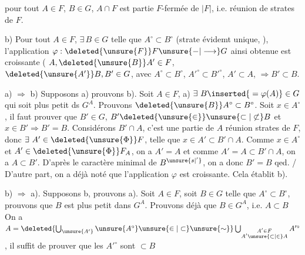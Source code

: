 pour tout $A\in F$, $B\in G$, $A\cap F$ est  partie $F$-fermée de $|F|$, i.e. réunion de strates de $F$.

b) Pour tout $A\in F$, $\exists\,B\in G$ telle que $A^\circ\subset B^\circ$ (strate évidemt unique, ), l'application $\varphi:\deleted{\unsure{F}}F\unsure{-|\longrightarrow}G$ ainsi obtenue est croissante (
   $A,\deleted{\unsure{B}}A'\in F$, $\deleted{\unsure{A'}}B,B'\in G$,  avec $A^\circ\subset B^\circ$, $A'^\circ\subset B'^\circ$, $A'\subset A$, $\Longrightarrow B'\subset B$.

a) $\Longrightarrow$ b) Supposons a) prouvons b). Soit $A\in F$,  a) $\exists\ B\inserted{{}=\varphi(A)}\in G$  qui soit plus petit ds $G^A$. Prouvons $\deleted{\unsure{B}}A^\circ\subset B^\circ$. Soit
$x\in A^\circ$, il faut prouver que $B'\in G$, $B'\deleted{\unsure{\in}}\unsure{\subset|\not\subset} B$ et $x\in B'\Longrightarrow B'=B$.  Considérons $B'\cap A$, c'est une partie de $A$ réunion  strates de $F$,
donc $\exists\ A'\in\deleted{\unsure{\Phi}}F$, telle que $x\in A'\subset B'\cap A$. Comme $x\in A^\circ$ et $A'\in\deleted{\unsure{\Phi}}F_A$, on a $A'=A$ et comme $A'=A\subset B'\cap A$, on a $A\subset B'$. D'après le caractère minimal de
$B^{\unsure{s|'}}$, on a donc $B'=B$ qed. / D'autre part, on a déjà noté que l'application $\varphi$ est croissante. Cela établit b).

b) $\Longrightarrow$ a). Supposons b, prouvons a). Soit $A\in F$, soit $B\in G$ telle que $A^\circ\subset B^\circ$, prouvons que $B$ est plus petit  dans $G^A$.
Prouvons déjà que $B\in G^A$, i.e. $A\subset B$ 
 On a $A=\deleted{\bigcup_{\unsure{A'}}\unsure{A^\circ}\unsure{\in|\subset}\unsure{\sim}}\bigcup_{\substack{A'\in F\\ A'\unsure{\subset|\in} A}} A'^\circ$,  il suffit de prouver que les $A'^\circ$ sont $\subset B$
